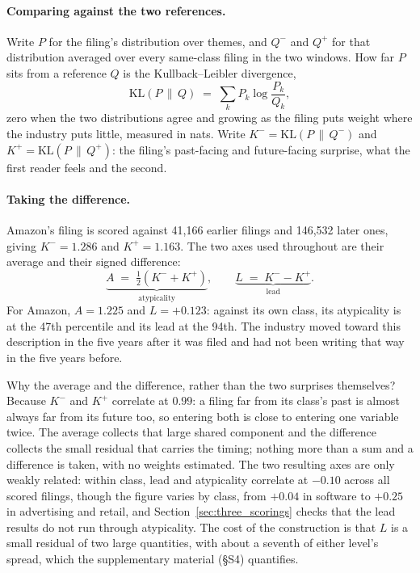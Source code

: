 \paragraph{Comparing against the two references.} Write $P$ for the
filing's distribution over themes, and $Q^{-}$ and $Q^{+}$ for that
distribution averaged over every same-class filing in the two windows.
How far $P$ sits from a reference $Q$ is the Kullback--Leibler
divergence,
\[
  \mathrm{KL}(P \,\|\, Q) \;=\; \sum_{k} P_k \log \frac{P_k}{Q_k},
\]
zero when the two distributions agree and growing as the filing puts
weight where the industry puts little, measured in nats. Write
$K^{-} = \mathrm{KL}(P \,\|\, Q^{-})$ and
$K^{+} = \mathrm{KL}(P \,\|\, Q^{+})$: the filing's past-facing and
future-facing surprise, what the first reader feels and the second.

\paragraph{Taking the difference.} Amazon's filing is scored against
41{,}166 earlier filings and 146{,}532 later ones, giving
$K^{-} = 1.286$ and $K^{+} = 1.163$. The two axes used throughout are
their average and their signed difference:
\[
  \underbrace{A \;=\; \tfrac{1}{2}\left(K^{-} + K^{+}\right)}_{\text{atypicality}},
  \qquad
  \underbrace{L \;=\; K^{-} - K^{+}}_{\text{lead}} .
\]
For Amazon, $A = 1.225$ and $L = +0.123$: against its own class, its
atypicality is at the 47th percentile and its lead at the 94th. The
industry moved toward this description in the five years after it was
filed and had not been writing that way in the five years before.

Why the average and the difference, rather than the two surprises
themselves? Because $K^{-}$ and $K^{+}$ correlate at $0.99$: a filing
far from its class's past is almost always far from its future too, so
entering both is close to entering one variable twice. The average
collects that large shared component and the difference collects the
small residual that carries the timing; nothing more than a sum and a
difference is taken, with no weights estimated. The two resulting
axes are only weakly related: within class, lead and atypicality
correlate at $-0.10$ across all scored filings, though the figure varies
by class, from $+0.04$ in software to $+0.25$ in advertising and retail,
and Section~\ref{sec:three_scorings} checks that the lead results do not
run through atypicality. The cost of the construction is that $L$ is a
small residual of two large quantities, with about a seventh of either
level's spread, which the supplementary material (\S S4) quantifies.

